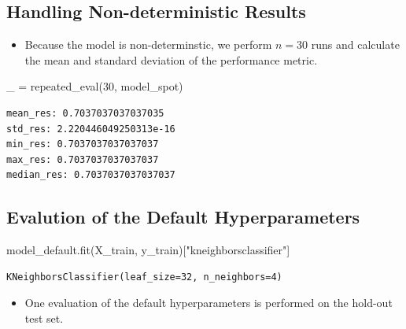 \documentclass[
  letterpaper,
  DIV=11,
  numbers=noendperiod]{scrreprt}
\newenvironment{Shaded}{\begin{snugshade}}{\end{snugshade}}
\newcommand{\DecValTok}[1]{\textcolor[rgb]{0.68,0.00,0.00}{#1}}
\newcommand{\NormalTok}[1]{\textcolor[rgb]{0.00,0.23,0.31}{#1}}
\newcommand{\OperatorTok}[1]{\textcolor[rgb]{0.37,0.37,0.37}{#1}}
\newcommand{\StringTok}[1]{\textcolor[rgb]{0.13,0.47,0.30}{#1}}
\providecommand{\tightlist}{%
  \setlength{\itemsep}{0pt}\setlength{\parskip}{0pt}}\usepackage{longtable,booktabs,array}
\begin{document}
\hypertarget{handling-non-deterministic-results-3}{%
\subsection{Handling Non-deterministic
Results}\label{handling-non-deterministic-results-3}}

\begin{itemize}
\tightlist
\item
  Because the model is non-determinstic, we perform \(n=30\) runs and
  calculate the mean and standard deviation of the performance metric.
\end{itemize}

\begin{Shaded}
\begin{Highlighting}[]
\NormalTok{\_ }\OperatorTok{=}\NormalTok{ repeated\_eval(}\DecValTok{30}\NormalTok{, model\_spot)}
\end{Highlighting}
\end{Shaded}

\begin{verbatim}
mean_res: 0.7037037037037035
std_res: 2.220446049250313e-16
min_res: 0.7037037037037037
max_res: 0.7037037037037037
median_res: 0.7037037037037037
\end{verbatim}

\hypertarget{evalution-of-the-default-hyperparameters-3}{%
\subsection{Evalution of the Default
Hyperparameters}\label{evalution-of-the-default-hyperparameters-3}}

\begin{Shaded}
\begin{Highlighting}[]
\NormalTok{model\_default.fit(X\_train, y\_train)[}\StringTok{"kneighborsclassifier"}\NormalTok{]}
\end{Highlighting}
\end{Shaded}

\begin{verbatim}
KNeighborsClassifier(leaf_size=32, n_neighbors=4)
\end{verbatim}

\begin{itemize}
\tightlist
\item
  One evaluation of the default hyperparameters is performed on the
  hold-out test set.
\end{itemize}
\end{document}
